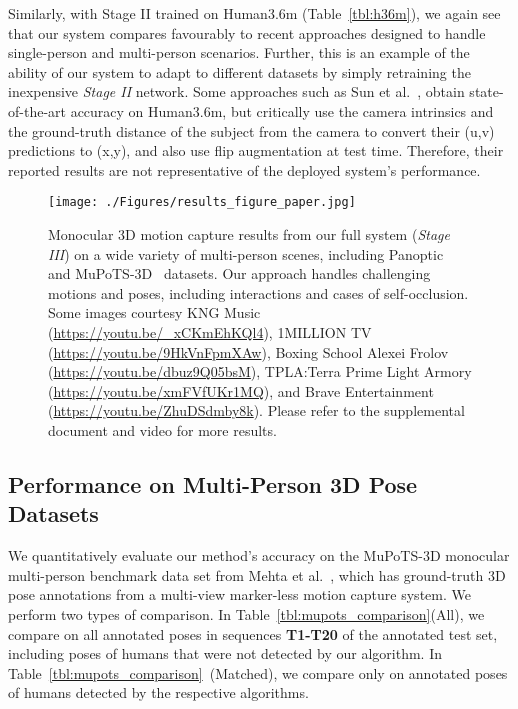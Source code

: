 \documentclass[acmtog,authorversion]{acmart}
\newcommand{\etal}{et al.}
\begin{document}
Similarly, with Stage II trained on Human3.6m (Table~\ref{tbl:h36m}), we again see that our system compares favourably to recent approaches designed to handle single-person and multi-person scenarios. 
Further, this is an example of the ability of our system to adapt to different datasets by simply retraining the inexpensive \textit{Stage II} network. 
Some approaches such as Sun \etal~, obtain state-of-the-art accuracy on Human3.6m, but critically use the camera intrinsics and the ground-truth distance of the subject from the camera to convert their (u,v) predictions to (x,y), and also use flip augmentation at test time. Therefore, their reported results are not representative of the deployed system's performance.




\begin{figure*}[]
  \texttt{[image: ./Figures/results\_figure\_paper.jpg]}
  \caption
  {Monocular 3D motion capture results from our full system (\textit{Stage III}) on a wide variety of multi-person scenes, including Panoptic~ and MuPoTS-3D~ datasets. Our approach handles challenging motions and poses, including interactions and cases of self-occlusion. 
  Some images courtesy KNG Music (\url{https://youtu.be/_xCKmEhKQl4}), 1MILLION TV (\url{https://youtu.be/9HkVnFpmXAw}), Boxing School Alexei Frolov (\url{https://youtu.be/dbuz9Q05bsM}), TPLA:Terra Prime Light Armory (\url{https://youtu.be/xmFVfUKr1MQ}), and Brave Entertainment (\url{https://youtu.be/ZhuDSdmby8k}).
  Please refer to the supplemental document and video for more results.}
  \label{fig:more_results}
\end{figure*}




\subsection{Performance on Multi-Person 3D Pose Datasets}
\label{res:multi_person}
We quantitatively evaluate our method's accuracy on the MuPoTS-3D monocular multi-person benchmark data set from Mehta \etal~, which has ground-truth 3D pose annotations from a multi-view marker-less motion capture system.
We perform two types of comparison. In Table~\ref{tbl:mupots_comparison}(All), we compare on all annotated poses in sequences \textbf{T1-T20} of the annotated test set, including poses of humans that were not detected by our algorithm.
In Table~\ref{tbl:mupots_comparison}~(Matched), we compare only on annotated poses of humans detected by the respective algorithms. 
\end{document}
